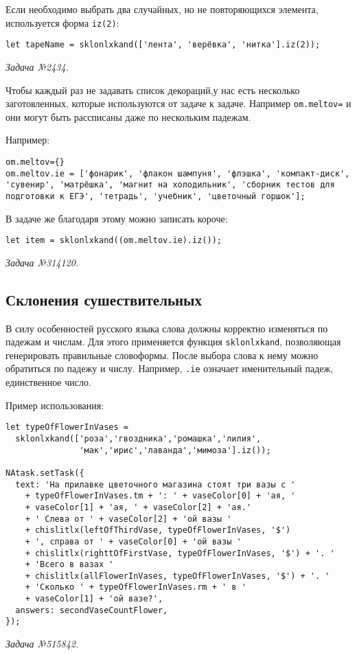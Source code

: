 Если необходимо выбрать два случайных, но не повторяющихся элемента, используется форма \texttt{iz(2)}:  
\begin{lstlisting}
let tapeName = sklonlxkand(['лента', 'верёвка', 'нитка'].iz(2));
\end{lstlisting}
\textsl{Задача №2434.}

Чтобы каждый раз не задавать список декораций,у нас есть несколько заготовленных, которые используются от задаче к задаче. Например \texttt{om.meltov={}} и они могут быть рассписаны даже по нескольким падежам.

Например: 
\begin{lstlisting}
om.meltov={}
om.meltov.ie = ['фонарик', 'флакон шампуня', 'флэшка', 'компакт-диск', 'сувенир', 'матрёшка', 'магнит на холодильник', 'сборник тестов для подготовки к ЕГЭ', 'тетрадь', 'учебник', 'цветочный горшок'];
\end{lstlisting}
В задаче же благодаря этому можно записать короче:
\begin{lstlisting}
let item = sklonlxkand((om.meltov.ie).iz());
\end{lstlisting}
\textsl{Задача №314120.}

\subsection{Склонения сушествительных}

В силу особенностей русского языка слова должны корректно изменяться по падежам и числам. Для этого применяется функция \texttt{sklonlxkand}, позволяющая генерировать правильные словоформы.  
После выбора слова к нему можно обратиться по падежу и числу. Например, \texttt{.ie} означает именительный падеж, единственное число.  

Пример использования:
\begin{lstlisting}
let typeOfFlowerInVases =
  sklonlxkand(['роза','гвоздника','ромашка','лилия',
               'мак','ирис','лаванда','мимоза'].iz());

NAtask.setTask({
  text: 'На прилавке цветочного магазина стоят три вазы с '
    + typeOfFlowerInVases.tm + ': ' + vaseColor[0] + 'ая, '
    + vaseColor[1] + 'ая, ' + vaseColor[2] + 'ая.' 
    + ' Слева от ' + vaseColor[2] + 'ой вазы '
    + chislitlx(leftOfThirdVase, typeOfFlowerInVases, '$')
    + ', справа от ' + vaseColor[0] + 'ой вазы '
    + chislitlx(righttOfFirstVase, typeOfFlowerInVases, '$') + '. '
    + 'Всего в вазах '
    + chislitlx(allFlowerInVases, typeOfFlowerInVases, '$') + '. '
    + 'Сколько ' + typeOfFlowerInVases.rm + ' в '
    + vaseColor[1] + 'ой вазе?',
  answers: secondVaseCountFlower,
});
\end{lstlisting}
\textsl{Задача №515842.}

